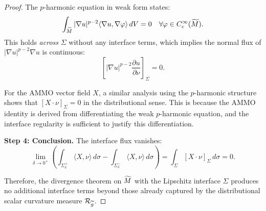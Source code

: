 \begin{proof}
The $p$-harmonic equation in weak form states:
\begin{equation}
    \int_{\widetilde{M}} |\nabla u|^{p-2} \langle \nabla u, \nabla \varphi \rangle \, dV = 0 \quad \forall \varphi \in C^\infty_c(\widetilde{M}).
\end{equation}
This holds \emph{across} $\Sigma$ without any interface terms, which implies the normal flux of $|\nabla u|^{p-2} \nabla u$ is continuous:
\begin{equation}
    \left[ |\nabla u|^{p-2} \frac{\partial u}{\partial \nu} \right]_\Sigma = 0.
\end{equation}

For the AMMO vector field $X$, a similar analysis using the $p$-harmonic structure shows that $[X \cdot \nu]_\Sigma = 0$ in the distributional sense. This is because the AMMO identity is derived from differentiating the weak $p$-harmonic equation, and the interface regularity is sufficient to justify this differentiation.

\textbf{Step 4: Conclusion.}
The interface flux vanishes:
\begin{equation}
    \lim_{\delta \to 0^+} \left( \int_{\Sigma^+_\delta} \langle X, \nu \rangle \, d\sigma - \int_{\Sigma^-_\delta} \langle X, \nu \rangle \, d\sigma \right) = \int_\Sigma [X \cdot \nu]_\Sigma \, d\sigma = 0.
\end{equation}

Therefore, the divergence theorem on $\widetilde{M}$ with the Lipschitz interface $\Sigma$ produces no additional interface terms beyond those already captured by the distributional scalar curvature measure $\mathcal{R}_{\widetilde{g}}$.
\end{proof}

